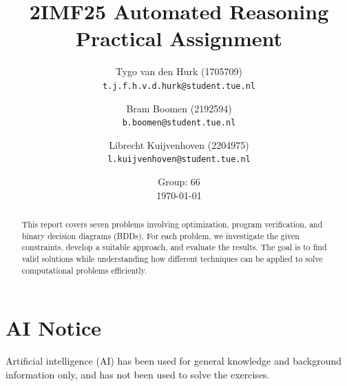 \documentclass[10pt,a4paper]{article}
\title{
    \textbf{2IMF25 Automated Reasoning}\\
    \large Practical Assignment
}
\author{
    Tygo van den Hurk \orcidlink{0009-0003-4182-5076} (1705709) \\
    \texttt{t.j.f.h.v.d.hurk@student.tue.nl}
    \and
    Bram Boomen (2192594) \\
    \texttt{b.boomen@student.tue.nl}
    \and
    Librecht Kuijvenhoven (2204975) \\
    \texttt{l.kuijvenhoven@student.tue.nl}
}
\date{
    Group: 66\\
    \today
}
\begin{document}
    \maketitle

    \begin{abstract}
	This report covers seven problems involving optimization,
	    program verification, and binary decision diagrams (BDDs).
	For each problem, we investigate the given constraints,
	    develop a suitable approach, and evaluate the results.
	The goal is to find valid solutions while understanding how different techniques can be applied to solve computational problems efficiently.
    \end{abstract}
    \pagebreak
    
    
    
    
    
    
    
    \section{AI Notice}
    Artificial intelligence (AI) has been used for general knowledge and background information only, and has not been used to solve the exercises.
    
\end{document}
